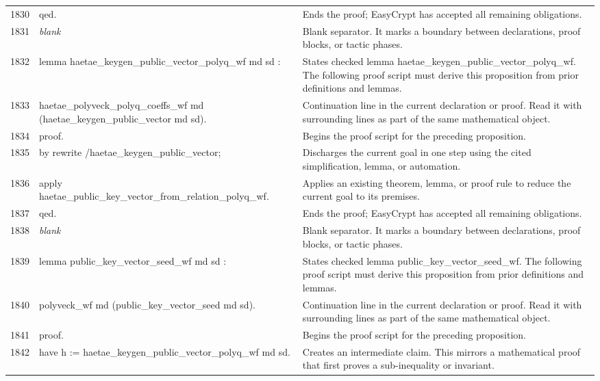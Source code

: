 \documentclass[10pt]{article}
\begin{document}
\begin{longtable}{r L{0.53\textwidth} L{0.37\textwidth}}
1830 & {\ttfamily\scriptsize qed.} & Ends the proof; EasyCrypt has accepted all remaining obligations. \\
1831 & {\ttfamily\scriptsize \emph{blank}} & Blank separator.  It marks a boundary between declarations, proof blocks, or tactic phases. \\
1832 & {\ttfamily\scriptsize lemma haetae\_keygen\_public\_vector\_polyq\_wf md sd :} & States checked lemma haetae\_keygen\_public\_vector\_polyq\_wf.  The following proof script must derive this proposition from prior definitions and lemmas. \\
1833 & {\ttfamily\scriptsize   haetae\_polyveck\_polyq\_coeffs\_wf md (haetae\_keygen\_public\_vector md sd).} & Continuation line in the current declaration or proof.  Read it with surrounding lines as part of the same mathematical object. \\
1834 & {\ttfamily\scriptsize proof.} & Begins the proof script for the preceding proposition. \\
1835 & {\ttfamily\scriptsize by rewrite /haetae\_keygen\_public\_vector;} & Discharges the current goal in one step using the cited simplification, lemma, or automation. \\
1836 & {\ttfamily\scriptsize    apply haetae\_public\_key\_vector\_from\_relation\_polyq\_wf.} & Applies an existing theorem, lemma, or proof rule to reduce the current goal to its premises. \\
1837 & {\ttfamily\scriptsize qed.} & Ends the proof; EasyCrypt has accepted all remaining obligations. \\
1838 & {\ttfamily\scriptsize \emph{blank}} & Blank separator.  It marks a boundary between declarations, proof blocks, or tactic phases. \\
1839 & {\ttfamily\scriptsize lemma public\_key\_vector\_seed\_wf md sd :} & States checked lemma public\_key\_vector\_seed\_wf.  The following proof script must derive this proposition from prior definitions and lemmas. \\
1840 & {\ttfamily\scriptsize   polyveck\_wf md (public\_key\_vector\_seed md sd).} & Continuation line in the current declaration or proof.  Read it with surrounding lines as part of the same mathematical object. \\
1841 & {\ttfamily\scriptsize proof.} & Begins the proof script for the preceding proposition. \\
1842 & {\ttfamily\scriptsize have h := haetae\_keygen\_public\_vector\_polyq\_wf md sd.} & Creates an intermediate claim.  This mirrors a mathematical proof that first proves a sub-inequality or invariant. \\

\end{longtable}
\end{document}
